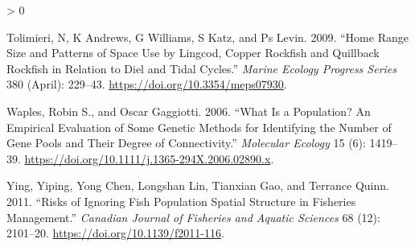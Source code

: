 \documentclass[11pt,
  english,
  a4paper,
]{article}
\newlength{\cslhangindent}
\newenvironment{CSLReferences}[2] %
 {%
  \setlength{\parindent}{0pt}
  \ifodd #1 \everypar{\setlength{\hangindent}{\cslhangindent}}\ignorespaces\fi
  \ifnum #2 > 0
  \setlength{\parskip}{#2\baselineskip}
  \fi
 }%
 {}
\begin{document}
\begin{CSLReferences}{1}{0}
\leavevmode\hypertarget{ref-tolimieri_home_2009}{}%
Tolimieri, N, K Andrews, G Williams, S Katz, and Ps Levin. 2009. {``Home Range Size and Patterns of Space Use by Lingcod, Copper Rockfish and Quillback Rockfish in Relation to Diel and Tidal Cycles.''} \emph{Marine Ecology Progress Series} 380 (April): 229--43. \url{https://doi.org/10.3354/meps07930}.

\leavevmode\hypertarget{ref-waples_what_2006}{}%
Waples, Robin S., and Oscar Gaggiotti. 2006. {``What Is a Population? {An} Empirical Evaluation of Some Genetic Methods for Identifying the Number of Gene Pools and Their Degree of Connectivity.''} \emph{Molecular Ecology} 15 (6): 1419--39. \url{https://doi.org/10.1111/j.1365-294X.2006.02890.x}.

\leavevmode\hypertarget{ref-ying_risks_2011}{}%
Ying, Yiping, Yong Chen, Longshan Lin, Tianxian Gao, and Terrance Quinn. 2011. {``Risks of Ignoring Fish Population Spatial Structure in Fisheries Management.''} \emph{Canadian Journal of Fisheries and Aquatic Sciences} 68 (12): 2101--20. \url{https://doi.org/10.1139/f2011-116}.

\end{CSLReferences}

\leavevmode\tagmcend\tagstructend
\end{document}
